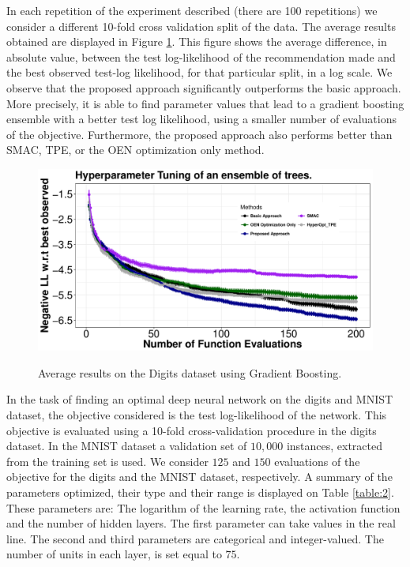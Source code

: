 In each repetition of the experiment described (there are 100 repetitions) we consider a different 10-fold
cross validation split of the data. The average results obtained are displayed in Figure \ref{fig:results_digits}.
This figure shows the average difference, in absolute value, between the test log-likelihood of the
recommendation made and the best observed test-log likelihood, for that particular split, in a log scale.
We observe that the proposed approach significantly outperforms the basic approach. More precisely, it is able
to find parameter values that lead to a gradient boosting ensemble with a better test log likelihood,
using a smaller number of evaluations of the objective. Furthermore, the proposed approach also performs
better than SMAC, TPE, or the OEN optimization only method.

\begin{figure}[htb]
        \begin{center}
        \includegraphics[width=0.7\linewidth]{Figures/integer/real/ensemble_digits_final_ok.pdf} \\
        \end{center}
\caption{{\small Average results on the Digits dataset using Gradient Boosting.}}
\label{fig:results_digits}
\end{figure}

In the task of finding an optimal deep neural network on the digits and MNIST dataset, the objective considered is
the test log-likelihood of the network.  This objective is evaluated using a 10-fold cross-validation procedure in the
digits dataset.  In the MNIST dataset a validation set of $10,000$ instances, extracted from the training set is used.
We consider $125$ and $150$ evaluations of the objective for the digits and the MNIST dataset, respectively.
A summary of the parameters optimized, their type and their range is displayed on Table \ref{table:2}. These parameters
are: The logarithm of the learning rate, the activation function and the number of hidden
layers. The first parameter can take values in the real line. The second and third
parameters are categorical and integer-valued. The number of units in each layer, is set
equal to $75$.

